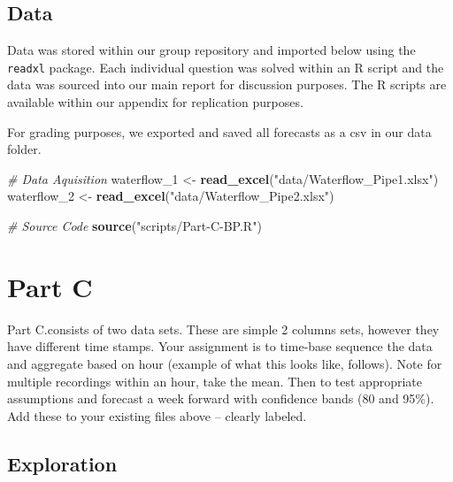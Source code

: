 \documentclass[openany]{book}
\newenvironment{Shaded}{\begin{snugshade}}{\end{snugshade}}
\newcommand{\CommentTok}[1]{\textcolor[rgb]{0.56,0.35,0.01}{\textit{#1}}}
\newcommand{\DecValTok}[1]{\textcolor[rgb]{0.00,0.00,0.81}{#1}}
\newcommand{\KeywordTok}[1]{\textcolor[rgb]{0.13,0.29,0.53}{\textbf{#1}}}
\newcommand{\NormalTok}[1]{#1}
\newcommand{\StringTok}[1]{\textcolor[rgb]{0.31,0.60,0.02}{#1}}
\renewenvironment{quote}{\begin{myquote}}{\end{myquote}}
\begin{document}
\newpage

\hypertarget{data}{%
\section*{Data}\label{data}}

Data was stored within our group repository and imported below using the
\texttt{readxl} package. Each individual question was solved within an R
script and the data was sourced into our main report for discussion
purposes. The R scripts are available within our appendix for
replication purposes.

For grading purposes, we exported and saved all forecasts as a csv in
our data folder.

\begin{Shaded}
\begin{Highlighting}[]
\CommentTok{# Data Aquisition}
\NormalTok{waterflow_}\DecValTok{1}\NormalTok{ <-}\StringTok{ }\KeywordTok{read_excel}\NormalTok{(}\StringTok{"data/Waterflow_Pipe1.xlsx"}\NormalTok{)}
\NormalTok{waterflow_}\DecValTok{2}\NormalTok{ <-}\StringTok{ }\KeywordTok{read_excel}\NormalTok{(}\StringTok{"data/Waterflow_Pipe2.xlsx"}\NormalTok{)}

\CommentTok{# Source Code}
\KeywordTok{source}\NormalTok{(}\StringTok{"scripts/Part-C-BP.R"}\NormalTok{)}
\end{Highlighting}
\end{Shaded}

\hypertarget{part-c}{%
\chapter{Part C}\label{part-c}}

\begin{quote}
Part C.consists of two data sets. These are simple 2 columns sets,
however they have different time stamps. Your assignment is to time-base
sequence the data and aggregate based on hour (example of what this
looks like, follows). Note for multiple recordings within an hour, take
the mean. Then to test appropriate assumptions and forecast a week
forward with confidence bands (80 and 95\%). Add these to your existing
files above -- clearly labeled.
\end{quote}

\hypertarget{exploration}{%
\section{Exploration}\label{exploration}}
\end{document}
